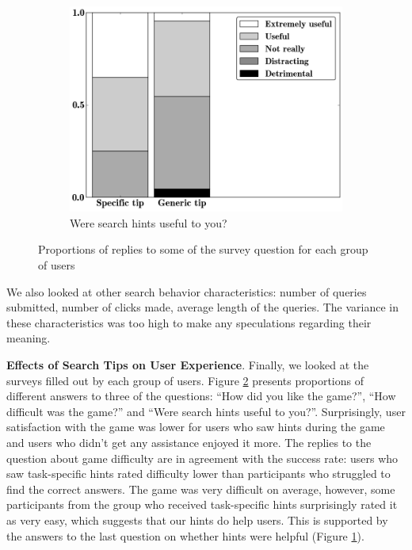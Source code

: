 \begin{figure}[h]
\begin{subfigure}[t]{0.32\textwidth}
	\includegraphics[scale=0.26]{img/hints_useful}
	\caption{Were search hints useful to you?}
    \label{figure:users:hints:survey:useful}
\end{subfigure}
\caption{Proportions of replies to some of the survey question for each group of users}
\label{figure:users:hints:survey}
\end{figure}

We also looked at other search behavior characteristics: number of queries submitted, number of clicks made, average length of the queries. The variance in these characteristics was too high to make any speculations regarding their meaning.

\textbf{Effects of Search Tips on User Experience}.
Finally, we looked at the surveys filled out by each group of users.
Figure \ref{figure:users:hints:survey} presents proportions of different answers to three of the questions: ``How did you like the game?'', ``How difficult was the game?'' and ``Were search hints useful to you?''.
Surprisingly, user satisfaction with the game was lower for users who saw hints during the game and users who didn't get any assistance enjoyed it more.
The replies to the question about game difficulty are in agreement with the success rate: users who saw task-specific hints rated difficulty lower than participants who struggled to find the correct answers.
The game was very difficult on average, however, some participants from the group who received task-specific hints surprisingly rated it as very easy, which suggests that our hints do help users.
This is supported by the answers to the last question on whether hints were helpful (Figure \ref{figure:users:hints:survey:useful}).

